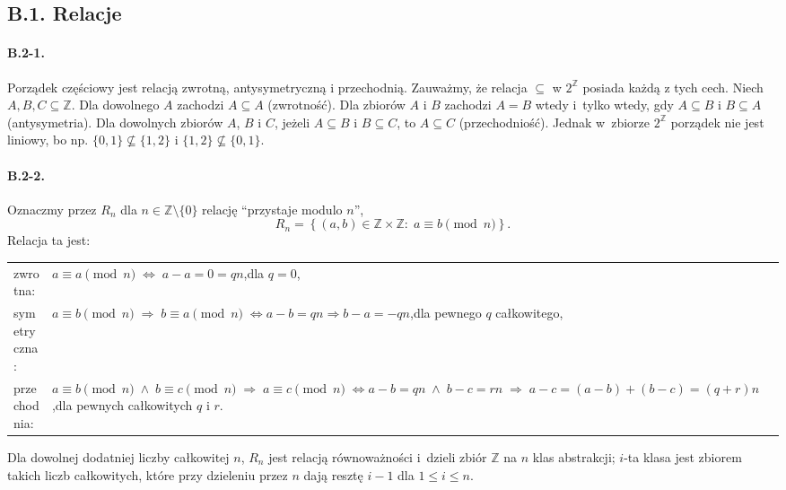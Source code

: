 \subsection*{B.1. Relacje}

\paragraph{B.2-1.}
Porządek częściowy jest relacją zwrotną, antysymetryczną i przechodnią. Zauważmy, że relacja $\subseteq$ w $2^\mathbb{Z}$ posiada każdą z tych cech. Niech $A,B,C\subseteq\mathbb{Z}$. Dla dowolnego $A$ zachodzi $A\subseteq A$ (zwrotność). Dla zbiorów $A$ i $B$ zachodzi $A=B$ wtedy i~tylko wtedy, gdy $A\subseteq B$ i $B\subseteq A$ (antysymetria). Dla dowolnych zbiorów $A$, $B$ i $C$, jeżeli $A\subseteq B$ i $B\subseteq C$, to $A\subseteq C$ (przechodniość). Jednak w~zbiorze $2^\mathbb{Z}$ porządek nie jest liniowy, bo np. $\{0,1\}\not\subseteq\{1,2\}$ i $\{1,2\}\not\subseteq\{0,1\}$.

\paragraph{B.2-2.}
Oznaczmy przez $R_n$ dla $n\in\mathbb{Z}\setminus\{ 0\}$ relację ``przystaje modulo $n$'',
\[
	R_n = \left\{(a,b)\in\mathbb{Z}\times\mathbb{Z}:\;a\equiv b\pmod{n}\right\}.
\]
Relacja ta jest:\medskip\\
\begin{tabular}{ll}
	zwrotna: & \parbox[t]{3.6in}{$a\equiv a\pmod{n}\;\Leftrightarrow\;a-a=0=qn$,\quad dla $q=0$,} \medskip\\
	symetryczna: & \parbox[t]{3.6in}{$a\equiv b\pmod{n}\;\Rightarrow\;b\equiv a\pmod{n}\;\Leftrightarrow\\a-b=qn\Rightarrow b-a=-qn$,\quad dla pewnego $q$ całkowitego,} \medskip\\
	przechodnia: & \parbox[t]{3.6in}{$a\equiv b\pmod{n}\;\wedge\;b\equiv c\pmod{n}\;\Rightarrow\;a\equiv c\pmod{n}\;\Leftrightarrow\\a-b=qn\;\wedge\;b-c=rn\;\Rightarrow\;a-c=(a-b)+(b-c)=(q+r)n$,\quad dla pewnych całkowitych $q$ i $r$.} \medskip\\
\end{tabular}

Dla dowolnej dodatniej liczby całkowitej $n$, $R_n$ jest relacją równoważności i~dzieli zbiór $\mathbb{Z}$ na $n$ klas abstrakcji; $i$-ta klasa jest zbiorem takich liczb całkowitych, które przy dzieleniu przez $n$ dają resztę $i-1$ dla $1\le i\le n$.

